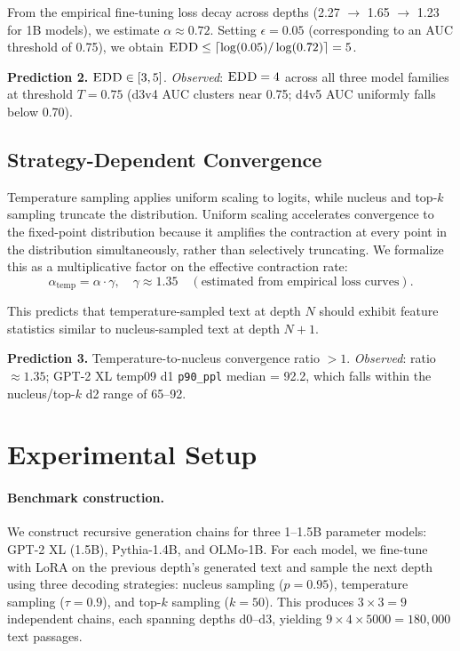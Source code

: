 \documentclass[11pt,a4paper]{article}
\newcommand{\edd}{\textsc{EDD}}
\begin{document}
From the empirical fine-tuning loss decay across depths (2.27 $\to$ 1.65 $\to$ 1.23 for 1B models), we estimate $\alpha \approx 0.72$. Setting $\epsilon = 0.05$ (corresponding to an AUC threshold of 0.75), we obtain $\edd \leq \lceil \log(0.05) / \log(0.72) \rceil = 5$.

\textbf{Prediction 2.} $\edd \in [3, 5]$. \emph{Observed}: $\edd = 4$ across all three model families at threshold $T = 0.75$ (d3v4 AUC clusters near 0.75; d4v5 AUC uniformly falls below 0.70).

\subsection{Strategy-Dependent Convergence}

Temperature sampling applies uniform scaling to logits, while nucleus and top-$k$ sampling truncate the distribution. Uniform scaling accelerates convergence to the fixed-point distribution because it amplifies the contraction at every point in the distribution simultaneously, rather than selectively truncating. We formalize this as a multiplicative factor on the effective contraction rate:
\[
    \alpha_{\mathrm{temp}} = \alpha \cdot \gamma, \quad \gamma \approx 1.35 \quad (\text{estimated from empirical loss curves}).
\]

This predicts that temperature-sampled text at depth $N$ should exhibit feature statistics similar to nucleus-sampled text at depth $N+1$.

\textbf{Prediction 3.} Temperature-to-nucleus convergence ratio $> 1$. \emph{Observed}: ratio $\approx 1.35$; GPT-2 XL temp09 d1 \texttt{p90\_ppl} median = 92.2, which falls within the nucleus/top-$k$ d2 range of 65--92.

\section{Experimental Setup}

\paragraph{Benchmark construction.}
We construct recursive generation chains for three 1--1.5B parameter models: GPT-2 XL (1.5B), Pythia-1.4B, and OLMo-1B. For each model, we fine-tune with LoRA on the previous depth's generated text and sample the next depth using three decoding strategies: nucleus sampling ($p = 0.95$), temperature sampling ($\tau = 0.9$), and top-$k$ sampling ($k = 50$). This produces $3 \times 3 = 9$ independent chains, each spanning depths d0--d3, yielding $9 \times 4 \times 5000 = 180{,}000$ text passages.
\end{document}

